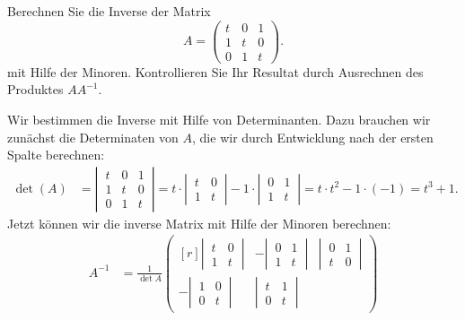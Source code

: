 Berechnen Sie die Inverse der Matrix
\[
A
=
\begin{pmatrix}
t&0&1\\
1&t&0\\
0&1&t
\end{pmatrix}.
\]
mit Hilfe der Minoren.
Kontrollieren Sie Ihr Resultat durch Ausrechnen des Produktes $AA^{-1}$.


\begin{loesung}
Wir bestimmen die Inverse mit Hilfe von Determinanten.
Dazu brauchen wir zunächst die Determinaten von $A$, die wir durch
Entwicklung nach der ersten Spalte berechnen:
\begin{align*}
\det(A)
&=
\left|\,\begin{matrix}
t&0&1\\
1&t&0\\
0&1&t
\end{matrix}\,\right|
=
t\cdot\left|\,\begin{matrix}t&0\\1&t\end{matrix}\,\right|
-1\cdot\left|\,\begin{matrix}0&1\\1&t\end{matrix}\,\right|
=
t\cdot t^2-1\cdot(-1)=t^3+1.
\end{align*}
Jetzt können wir die inverse Matrix mit Hilfe der Minoren berechnen:
\begin{align}
A^{-1}
&=
\frac1{\det{A}}\begin{pmatrix*}[r]
\left|\,\begin{matrix}t&0\\1&t\end{matrix}\,\right|
	&-\left|\,\begin{matrix}0&1\\1&t\end{matrix}\,\right|
		&\left|\,\begin{matrix}0&1\\t&0\end{matrix}\,\right|
			\\[11pt]
-\left|\,\begin{matrix}1&0\\0&t\end{matrix}\,\right|
	&\left|\,\begin{matrix}t&1\\0&t\end{matrix}\,\right|

\end{pmatrix*}
\end{align}
\end{loesung}
